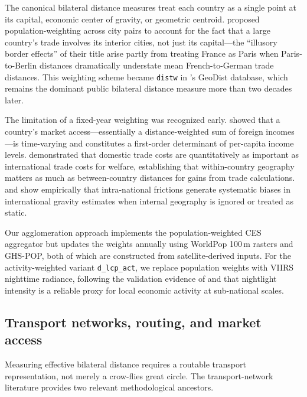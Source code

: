 \documentclass[11pt, a4paper]{article}
\begin{document}
The canonical bilateral distance measures treat each country as a single
point at its capital, economic center of gravity, or geometric centroid.
\citet{head_mayer_2002} proposed population-weighting across city pairs to
account for the fact that a large country's trade involves its interior cities,
not just its capital---the ``illusory border effects'' of their title arise
partly from treating France as Paris when Paris-to-Berlin distances dramatically
understate mean French-to-German trade distances.
This weighting scheme became \texttt{distw} in \citet{mayer_zignago_2011}'s
GeoDist database, which remains the dominant public bilateral distance measure
more than two decades later.

The limitation of a fixed-year weighting was recognized early.
\citet{redding_venables_2004} showed that a country's market access---essentially
a distance-weighted sum of foreign incomes---is time-varying and constitutes
a first-order determinant of per-capita income levels.
\citet{ramondo_rodriguezclare_saborio_2016} demonstrated that domestic trade
costs are quantitatively as important as international trade costs for welfare,
establishing that within-country geography matters as much as between-country
distances for gains from trade calculations.
\citet{cosar_fajgelbaum_2016} and \citet{agnosteva_anderson_yotov_2019} show
empirically that intra-national frictions generate systematic biases in
international gravity estimates when internal geography is ignored or
treated as static.

Our agglomeration approach implements the \citet{head_mayer_2002} population-weighted
CES aggregator but updates the weights annually using WorldPop 100\,m rasters
and GHS-POP, both of which are constructed from satellite-derived inputs.
For the activity-weighted variant \texttt{d\_lcp\_act}, we replace population weights
with VIIRS nighttime radiance, following the validation evidence of
\citet{henderson_storeygard_weil_2012} and \citet{jean_burke_xie_davis_lobell_ermon_2016}
that nightlight intensity is a reliable proxy for local economic activity at
sub-national scales.

\subsection{Transport networks, routing, and market access}

Measuring effective bilateral distance requires a routable transport
representation, not merely a crow-flies great circle.
The transport-network literature provides two relevant methodological ancestors.
\end{document}
